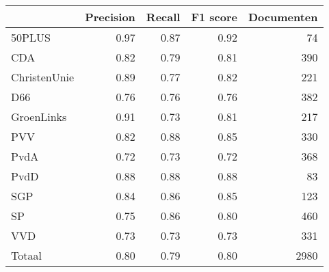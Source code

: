 \begin{tabular}{lrrrr}
\toprule
{} &  Precision &  Recall &  F1 score &  Documenten \\
\midrule
50PLUS       &       0.97 &    0.87 &      0.92 &          74 \\
CDA          &       0.82 &    0.79 &      0.81 &         390 \\
ChristenUnie &       0.89 &    0.77 &      0.82 &         221 \\
D66          &       0.76 &    0.76 &      0.76 &         382 \\
GroenLinks   &       0.91 &    0.73 &      0.81 &         217 \\
PVV          &       0.82 &    0.88 &      0.85 &         330 \\
PvdA         &       0.72 &    0.73 &      0.72 &         368 \\
PvdD         &       0.88 &    0.88 &      0.88 &          83 \\
SGP          &       0.84 &    0.86 &      0.85 &         123 \\
SP           &       0.75 &    0.86 &      0.80 &         460 \\
VVD          &       0.73 &    0.73 &      0.73 &         331 \\
Totaal       &       0.80 &    0.79 &      0.80 &        2980 \\
\bottomrule
\end{tabular}
